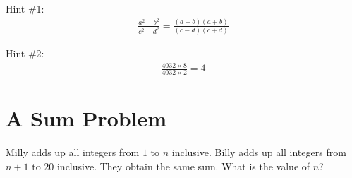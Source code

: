 \documentclass[12pt]{article}
\newenvironment{answer}{\vspace{1em}\color{blue!90!black}}{}
\newenvironment{answer}{\vspace{0em}\expandafter\comment}{\expandafter\endcomment}
\begin{document}
\begin{answer}
Hint \#1:
\begin{align*}
\frac{a^2 - b^2}{c^2 - d^2}
= \frac{(a-b)(a+b)}{(c-d)(c+d)}
\end{align*}

Hint \#2:
\begin{align*}
\frac{4032 \times 8}{4032 \times 2} = 4 
\end{align*}
\end{answer}

\section{A Sum Problem}
Milly adds up all integers from $1$ to $n$ inclusive.
Billy adds up all integers from $n+1$ to $20$ inclusive.
They obtain the same sum. What is the value of $n$?
\end{document}
